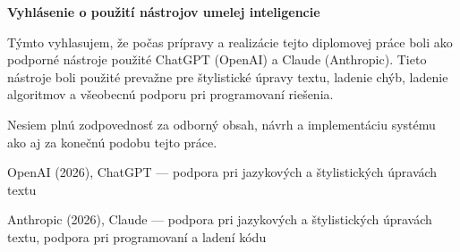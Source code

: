 \pagestyle{plain}

\textbf{Vyhlásenie o použití nástrojov umelej inteligencie}

Týmto vyhlasujem, že počas prípravy a realizácie tejto diplomovej práce boli ako podporné nástroje použité ChatGPT (OpenAI) a Claude (Anthropic).
Tieto nástroje boli použité prevažne pre štylistické úpravy textu, ladenie chýb, ladenie algoritmov a všeobecnú podporu pri programovaní riešenia.

Nesiem plnú zodpovednosť za odborný obsah, návrh a implementáciu systému ako aj za konečnú podobu tejto práce.

OpenAI (2026), ChatGPT — podpora pri jazykových a štylistických úpravách textu

Anthropic (2026), Claude — podpora pri jazykových a štylistických úpravách textu, podpora pri programovaní a ladení kódu
